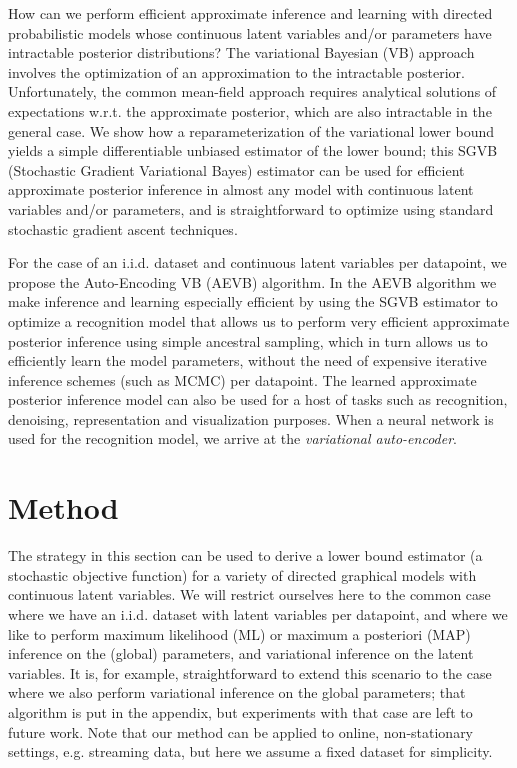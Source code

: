 \documentclass{article} %
\theoremstyle{definition}
\begin{document}
%

%
How can we perform efficient approximate inference and learning with directed probabilistic models 
whose continuous latent variables and/or parameters have intractable posterior distributions?
The variational Bayesian (VB) approach involves the optimization of an approximation to the intractable posterior. Unfortunately, the common mean-field approach requires analytical solutions of expectations w.r.t. the approximate posterior, which are also intractable in the general case. We show how a reparameterization of the variational lower bound yields a simple differentiable unbiased estimator of the lower bound; this SGVB (Stochastic Gradient Variational Bayes) estimator can be used for efficient approximate posterior inference in almost any model with continuous latent variables and/or parameters, and is straightforward to optimize using standard stochastic gradient ascent techniques.

%
For the case of an i.i.d. dataset and continuous latent variables per datapoint, we propose the Auto-Encoding VB (AEVB) algorithm. In the AEVB algorithm we make inference and learning especially efficient by using the SGVB estimator to optimize a recognition model that allows us to perform very efficient approximate posterior inference using simple ancestral sampling, which in turn allows us to efficiently learn the model parameters, without the need of expensive iterative inference schemes (such as MCMC) per datapoint. The learned approximate posterior inference model can also be used for a host of tasks such as recognition, denoising, representation and visualization purposes. When a neural network is used for the recognition model, we arrive at the \emph{variational auto-encoder}.

%
%
%
%

%

%
%

\section{Method}
\label{sec:method}

The strategy in this section can be used to derive a lower bound estimator (a stochastic objective function) for a variety of directed graphical models with continuous latent variables. We will restrict ourselves here to the common case where we have an i.i.d. dataset with latent variables per datapoint, and where we like to perform maximum likelihood (ML) or maximum a posteriori (MAP) inference on the (global) parameters, and variational inference on the latent variables. It is, for example, straightforward to extend this scenario to the case where we also perform variational inference on the global parameters; that algorithm is put in the appendix, but experiments with that case are left to future work. Note that our method can be applied to online, non-stationary settings, e.g. streaming data, but here we assume a fixed dataset for simplicity.
\end{document}
